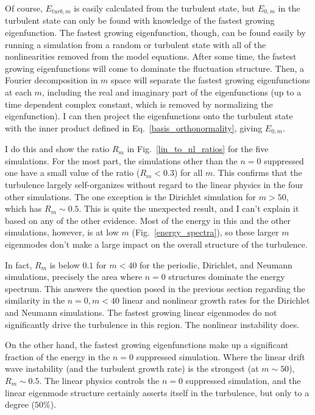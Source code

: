 Of course, $E_{turb,m}$ is easily calculated from the turbulent state, but $E_{0,m}$ in the 
turbulent state can only be found with knowledge of the fastest growing eigenfunction. The fastest growing eigenfunction, though, can be found easily by running a simulation from a random 
or turbulent state with all of the nonlinearities removed from the model equations. After some time, the fastest growing eigenfunctions will come to
dominate the fluctuation structure. Then, a Fourier decomposition in $m$ space will separate the fastest growing eigenfunctions at each $m$, including the real and imaginary part
of the eigenfunctions (up to a time dependent complex constant, which is removed by normalizing the eigenfunction). I can then project the eigenfunctions onto the turbulent state
with the inner product defined in Eq.~\ref{basis_orthonormality}, giving $E_{0,m}$.

I do this and show the ratio $R_m$ in Fig.~\ref{lin_to_nl_ratios} for the five simulations. 
For the most part, the simulations other than the $n=0$ suppressed one have a small value of the ratio ($R_m < 0.3$) for all $m$. 
This confirms that the turbulence largely self-organizes without regard to the linear physics in the four other simulations. 
The one exception is the Dirichlet simulation for $m > 50$, which has $R_m \sim 0.5$. This is quite the unexpected result, and I can't explain it based on any of the other evidence.
Most of the energy in this and the other simulations, however, 
is at low $m$ (Fig.~\ref{energy_spectra}), so these larger $m$ eigenmodes don't make a large impact on the overall structure of the turbulence.

In fact, $R_m$ is below $0.1$ for $m<40$ for the periodic, Dirichlet, and Neumann simulations, precisely the area where
$n=0$ structures dominate the energy spectrum. This answers the question posed in the previous section regarding the similarity in the $n=0, m<40$ linear and nonlinear growth rates
for the Dirichlet and Neumann simulations. The fastest growing linear eigenmodes do not significantly drive the turbulence in this region. The nonlinear instability does.

On the other hand, the fastest growing eigenfunctions make up a significant fraction of the energy in the $n=0$ suppressed simulation. Where the linear drift wave instability 
(and the turbulent growth rate) is the strongest (at $m \sim 50$), $R_m \sim 0.5$. The linear physics controls the $n=0$ suppressed simulation, and the linear eigenmode structure certainly asserts itself
in the turbulence, but only to a degree ($50\%$).

